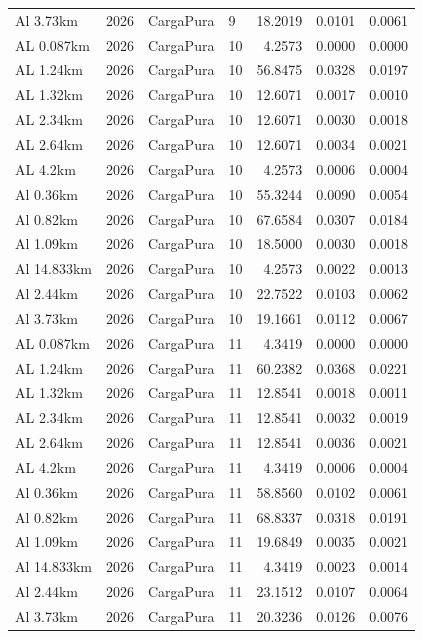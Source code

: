 \documentclass[11pt,a4paper]{article}
\begin{document}
\begin{longtable}{llllrrr}
Al 3.73km & 2026 & CargaPura & 9 & 18.2019 & 0.0101 & 0.0061 \\
AL 0.087km & 2026 & CargaPura & 10 & 4.2573 & 0.0000 & 0.0000 \\
AL 1.24km & 2026 & CargaPura & 10 & 56.8475 & 0.0328 & 0.0197 \\
AL 1.32km & 2026 & CargaPura & 10 & 12.6071 & 0.0017 & 0.0010 \\
AL 2.34km & 2026 & CargaPura & 10 & 12.6071 & 0.0030 & 0.0018 \\
AL 2.64km & 2026 & CargaPura & 10 & 12.6071 & 0.0034 & 0.0021 \\
AL 4.2km & 2026 & CargaPura & 10 & 4.2573 & 0.0006 & 0.0004 \\
Al 0.36km & 2026 & CargaPura & 10 & 55.3244 & 0.0090 & 0.0054 \\
Al 0.82km & 2026 & CargaPura & 10 & 67.6584 & 0.0307 & 0.0184 \\
Al 1.09km & 2026 & CargaPura & 10 & 18.5000 & 0.0030 & 0.0018 \\
Al 14.833km & 2026 & CargaPura & 10 & 4.2573 & 0.0022 & 0.0013 \\
Al 2.44km & 2026 & CargaPura & 10 & 22.7522 & 0.0103 & 0.0062 \\
Al 3.73km & 2026 & CargaPura & 10 & 19.1661 & 0.0112 & 0.0067 \\
AL 0.087km & 2026 & CargaPura & 11 & 4.3419 & 0.0000 & 0.0000 \\
AL 1.24km & 2026 & CargaPura & 11 & 60.2382 & 0.0368 & 0.0221 \\
AL 1.32km & 2026 & CargaPura & 11 & 12.8541 & 0.0018 & 0.0011 \\
AL 2.34km & 2026 & CargaPura & 11 & 12.8541 & 0.0032 & 0.0019 \\
AL 2.64km & 2026 & CargaPura & 11 & 12.8541 & 0.0036 & 0.0021 \\
AL 4.2km & 2026 & CargaPura & 11 & 4.3419 & 0.0006 & 0.0004 \\
Al 0.36km & 2026 & CargaPura & 11 & 58.8560 & 0.0102 & 0.0061 \\
Al 0.82km & 2026 & CargaPura & 11 & 68.8337 & 0.0318 & 0.0191 \\
Al 1.09km & 2026 & CargaPura & 11 & 19.6849 & 0.0035 & 0.0021 \\
Al 14.833km & 2026 & CargaPura & 11 & 4.3419 & 0.0023 & 0.0014 \\
Al 2.44km & 2026 & CargaPura & 11 & 23.1512 & 0.0107 & 0.0064 \\
Al 3.73km & 2026 & CargaPura & 11 & 20.3236 & 0.0126 & 0.0076 \\

\end{longtable}
\end{document}
